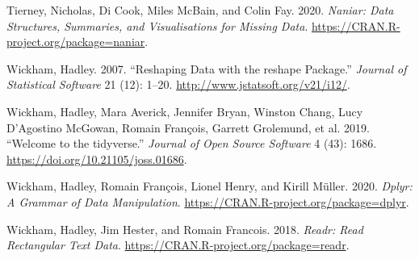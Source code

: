 \documentclass[
]{article}
\begin{document}
\leavevmode\hypertarget{ref-naniar}{}%
Tierney, Nicholas, Di Cook, Miles McBain, and Colin Fay. 2020. \emph{Naniar: Data Structures, Summaries, and Visualisations for Missing Data}. \url{https://CRAN.R-project.org/package=naniar}.

\leavevmode\hypertarget{ref-reshape}{}%
Wickham, Hadley. 2007. ``Reshaping Data with the reshape Package.'' \emph{Journal of Statistical Software} 21 (12): 1--20. \url{http://www.jstatsoft.org/v21/i12/}.

\leavevmode\hypertarget{ref-tidyverse}{}%
Wickham, Hadley, Mara Averick, Jennifer Bryan, Winston Chang, Lucy D'Agostino McGowan, Romain François, Garrett Grolemund, et al. 2019. ``Welcome to the tidyverse.'' \emph{Journal of Open Source Software} 4 (43): 1686. \url{https://doi.org/10.21105/joss.01686}.

\leavevmode\hypertarget{ref-dplyr}{}%
Wickham, Hadley, Romain François, Lionel Henry, and Kirill Müller. 2020. \emph{Dplyr: A Grammar of Data Manipulation}. \url{https://CRAN.R-project.org/package=dplyr}.

\leavevmode\hypertarget{ref-readr}{}%
Wickham, Hadley, Jim Hester, and Romain Francois. 2018. \emph{Readr: Read Rectangular Text Data}. \url{https://CRAN.R-project.org/package=readr}.
\end{document}
